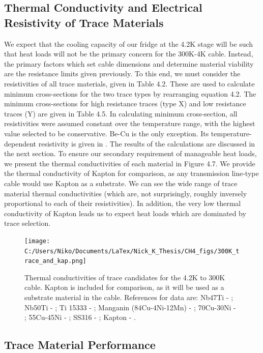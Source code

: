 \documentclass{report}
\begin{document}
\subsection{Thermal Conductivity and Electrical Resistivity of Trace Materials}

We expect that the cooling capacity of our fridge at the 4.2K stage will be such that heat loads will not be the primary concern for the 300K-4K cable. Instead, the primary factors which set cable dimensions and determine material viability are the resistance limits given previously. To this end, we must consider the resistivities of all trace materials, given in Table 4.2. These are used to calculate minimum cross-sections for the two trace types by rearranging equation 4.2. The minimum cross-sections for high resistance traces (type X) and low resistance traces (Y) are given in Table 4.5. In calculating minimum cross-section, all resistivities were assumed constant over the temperature range, with the highest value selected to be conservative. Be-Cu is the only exception. Its temperature-dependent resistivity is given in \cite{Sciver1986}. The results of the calculations are discussed in the next section.
To ensure our secondary requirement of manageable heat loads, we present the thermal conductivities of each material in  Figure 4.7. We provide the thermal conductivity of Kapton for comparison, as any transmission line-type cable would use Kapton as a substrate. We can see the wide range of trace material thermal conductivities (which are, not surprisingly, roughly inversely proportional to each of their resistivities). In addition, the very low thermal conductivity of Kapton leads us to expect heat loads which are dominated by trace selection. 

\begin{figure}[ht]
\centering
\texttt{[image: C:/Users/Niko/Documents/LaTex/Nick\_K\_Thesis/CH4\_figs/300K\_trace\_and\_kap.png]}
\caption{Thermal conductivities of trace candidates for the 4.2K to 300K cable. Kapton is included for comparison, as it will be used as a substrate material in the cable. References for data are: Nb47Ti - \cite{Blake} ; Nb50Ti - \cite{Flachbart1978} ; Ti 15333 - \cite{Canavan2006} ; Manganin (84Cu-4Ni-12Mn) - \cite{tou} ; 70Cu-30Ni - \cite{Blake} ; 55Cu-45Ni - \cite{tou} ; SS316 - \cite{ss316_nist} ; Kapton - \cite{Rule1996}.}
\end{figure}

\subsection{Trace Material Performance}
\end{document}
